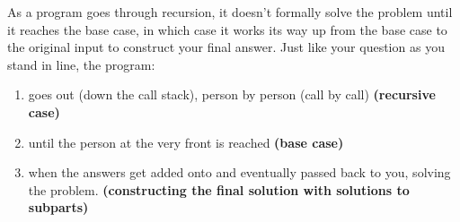 \begin{blocksection}
As a program goes through recursion, it doesn't formally solve the problem until it reaches the base case, in which case it works its way up from the base case to the original input to construct your final answer. Just like your question as you stand in line, the program: 

\begin{enumerate}
	\item goes out (down the call stack), person by person (call by call) \textbf{(recursive case)}
	\item until the person at the very front is reached \textbf{(base case)}
	\item when the answers get added onto and eventually passed back to you, solving the problem. \textbf{(constructing the final solution with solutions to subparts)}
\end{enumerate}

\end{blocksection}

